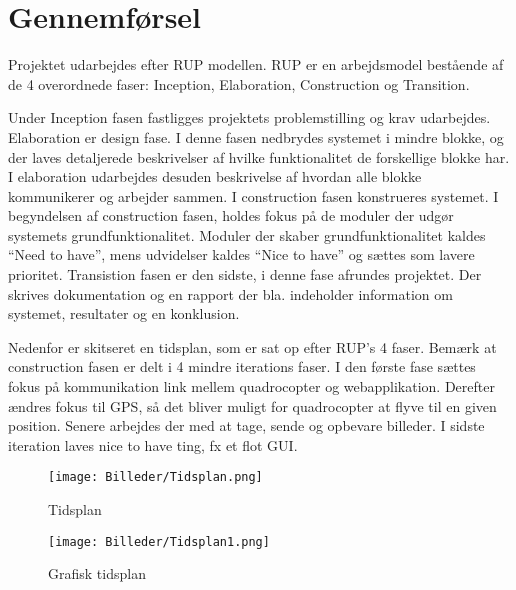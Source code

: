\chapter{Gennemførsel}

\vspace{-10pt}

Projektet udarbejdes efter RUP modellen. RUP er en arbejdsmodel bestående af de 4 overordnede faser: Inception, Elaboration, Construction og Transition.

Under Inception fasen fastligges projektets problemstilling og krav udarbejdes.
Elaboration er design fase. I denne fasen nedbrydes systemet i mindre blokke, 
og der laves detaljerede beskrivelser af hvilke funktionalitet de forskellige blokke har.
I elaboration udarbejdes desuden beskrivelse af hvordan alle blokke kommunikerer og arbejder sammen.  
I construction fasen konstrueres systemet. I begyndelsen af construction fasen, holdes fokus på de
moduler der udgør systemets grundfunktionalitet. Moduler der skaber grundfunktionalitet kaldes “Need to have”, mens udvidelser kaldes “Nice to have” og sættes som lavere prioritet.
Transistion fasen er den sidste, i denne fase afrundes projektet. Der skrives dokumentation og en rapport der bla. indeholder information om systemet, resultater og en konklusion.


Nedenfor er skitseret en tidsplan, som er sat op efter RUP's 4 faser.
Bemærk at construction fasen er delt i 4 mindre iterations faser.
I den første fase sættes fokus på kommunikation link mellem quadrocopter og webapplikation.
Derefter ændres fokus til GPS, så det bliver muligt for quadrocopter at flyve til en given position.
Senere arbejdes der med at tage, sende og opbevare billeder.
I sidste iteration laves nice to have ting, fx et flot GUI.



\begin{figure}[H]
\centering
\texttt{[image: Billeder/Tidsplan.png]}
\caption{Tidsplan}
\label{fig:Tidsplan}
\end{figure}

\newpage

\begin{figure}
\centering
\texttt{[image: Billeder/Tidsplan1.png]}
\caption{Grafisk tidsplan}
\label{fig:Grafisk_tidsplan}
\end{figure}